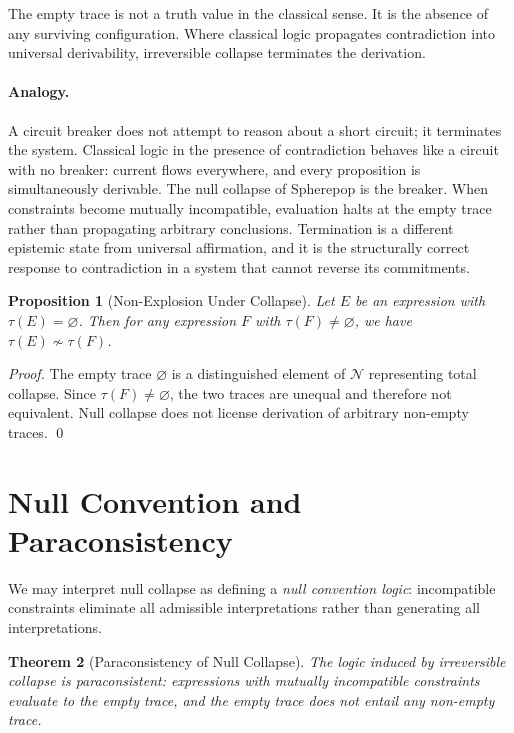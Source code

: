 \documentclass[12pt, oneside]{amsbook}
\theoremstyle{plain}
\newtheorem{theorem}{Theorem}[section]
\newtheorem{proposition}[theorem]{Proposition}
\theoremstyle{definition}
\theoremstyle{remark}
\newcommand{\NF}{\mathcal{N}}
\newcommand{\trace}{\tau}
\newcommand{\tequiv}{\sim}
\begin{document}
The empty trace is not a truth value in the classical sense. It is the absence
of any surviving configuration. Where classical logic propagates contradiction
into universal derivability, irreversible collapse terminates the derivation.

\paragraph{Analogy.}
A circuit breaker does not attempt to reason about a short circuit; it terminates the system. Classical logic in the presence of contradiction behaves like a circuit with no breaker: current flows everywhere, and every proposition is simultaneously derivable. The null collapse of Spherepop is the breaker. When constraints become mutually incompatible, evaluation halts at the empty trace rather than propagating arbitrary conclusions. Termination is a different epistemic state from universal affirmation, and it is the structurally correct response to contradiction in a system that cannot reverse its commitments.

\begin{proposition}[Non-Explosion Under Collapse]
\label{prop:no-explosion}
Let $E$ be an expression with $\trace(E) = \varnothing$. Then for any
expression $F$ with $\trace(F) \neq \varnothing$, we have
$\trace(E) \not\tequiv \trace(F)$.
\end{proposition}

\begin{proof}
The empty trace $\varnothing$ is a distinguished element of $\NF$
representing total collapse. Since $\trace(F) \neq \varnothing$, the two
traces are unequal and therefore not equivalent. Null collapse does not
license derivation of arbitrary non-empty traces. \qed
\end{proof}

\section{Null Convention and Paraconsistency}
\label{sec:para:ncl}

We may interpret null collapse as defining a \emph{null convention logic}:
incompatible constraints eliminate all admissible interpretations rather than
generating all interpretations.

\begin{theorem}[Paraconsistency of Null Collapse]
\label{thm:paraconsistent}
The logic induced by irreversible collapse is paraconsistent: expressions
with mutually incompatible constraints evaluate to the empty trace, and the
empty trace does not entail any non-empty trace.
\end{theorem}
\end{document}
